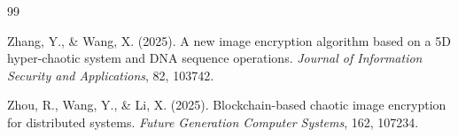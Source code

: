 \begin{thebibliography}{99}
\begin{LTRbibitems}
 Zhang, Y., \& Wang, X. (2025). A new image encryption algorithm based on a 5D hyper-chaotic system and DNA sequence operations. \textit{Journal of Information Security and Applications}, 82, 103742.
\end{LTRbibitems}

\begin{LTRbibitems}
 Zhou, R., Wang, Y., \& Li, X. (2025). Blockchain-based chaotic image encryption for distributed systems. \textit{Future Generation Computer Systems}, 162, 107234.
\end{LTRbibitems}

\end{thebibliography}
